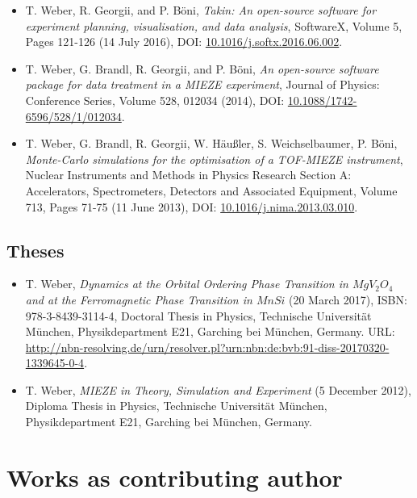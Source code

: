 \begin{itemize}
	\item T. Weber, R. Georgii, and P. B\"oni,
	\textit{Takin: An open-source software for experiment planning, visualisation, and data analysis},
	SoftwareX, Volume 5, Pages 121-126 (14 July 2016),
	DOI: \href{https://doi.org/10.1016/j.softx.2016.06.002}{10.1016/j.softx.2016.06.002}.

	\item T. Weber, G. Brandl, R. Georgii, and P. B\"oni,
	\textit{An open-source software package for data treatment in a MIEZE experiment},
	Journal of Physics: Conference Series, Volume 528, 012034 (2014),
	DOI: \href{https://doi.org/10.1088/1742-6596/528/1/012034}{10.1088/1742-6596/528/1/012034}.
	
	\item T. Weber, G. Brandl, R. Georgii, W. H\"au\ss{}ler, S. Weichselbaumer, P. B\"oni,
	\textit{Monte-Carlo simulations for the optimisation of a TOF-MIEZE instrument},
	Nuclear Instruments and Methods in Physics Research Section A: Accelerators, Spectrometers, Detectors and Associated Equipment, Volume 713, Pages 71-75 (11 June 2013),
	DOI: \href{https://doi.org/10.1016/j.nima.2013.03.010}{10.1016/j.nima.2013.03.010}.
\end{itemize}


\subsection*{Theses}
\begin{itemize}
	\item T. Weber, \textit{Dynamics at the Orbital Ordering Phase Transition in $MgV_2O_4$ and at the Ferromagnetic Phase Transition in $MnSi$} (20 March 2017), ISBN: 978-3-8439-3114-4,
	Doctoral Thesis in Physics, Technische Universit\"at M\"unchen, Physikdepartment E21,
	Garching bei M\"unchen, Germany. URL: \url{http://nbn-resolving.de/urn/resolver.pl?urn:nbn:de:bvb:91-diss-20170320-1339645-0-4}.

	\item T. Weber, \textit{MIEZE in Theory, Simulation and Experiment} (5 December 2012), 
	Diploma Thesis in Physics, Technische Universit\"at M\"unchen, Physikdepartment E21,
	Garching bei M\"unchen, Germany.
\end{itemize}



\section{Works as contributing author}

